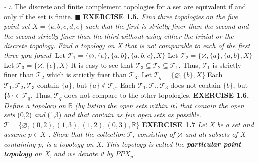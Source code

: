 \documentclass[12pt]{article}
\begin{document}
	\newline \(\square\) \newline
	\(\therefore\) The discrete and finite complement topologies for a set are equivalent if and only if the set is finite. \newline
	\(\blacksquare\)
	\newpage
	\noindent
	\textbf{EXERCISE 1.5.} \textit{Find three topologies on the five point set} \(X=\{a,b,c,d,e\}\) \textit{such that the first is strictly finer than the second and the second strictly finer than the third without using either the trivial or the discrete topology. Find a topology on X that is not comparable to each of the first three you found.}
	\newline \newline
	Let \(\mathcal{T}_1=\{\varnothing, \{a\}, \{a,b\}, \{a,b,c\}, X\}\)
	\newline
	Let \(\mathcal{T}_2=\{\varnothing, \{a\}, \{a,b\}, X\}\)
	\newline
	Let \(\mathcal{T}_3=\{\varnothing, \{a\}, X\}\)
	\newline \newline
	It is easy to see that \(\mathcal{T}_3 \subseteq \mathcal{T}_2 \subseteq \mathcal{T}_1\). \newline
	Thus, \(\mathcal{T}_1\) is strictly finer than \(\mathcal{T}_2\) which is strictly finer than \(\mathcal{T}_3\).
	\newline \newline
	Let \(\mathcal{T}_q=\{\varnothing, \{b\}, X\}\) \newline \newline
	Each \(\mathcal{T}_1,\mathcal{T}_2,\mathcal{T}_3\) contain \(\{a\}\), but \(\{a\} \notin \mathcal{T}_q\). \newline
	Each \(\mathcal{T}_1,\mathcal{T}_2,\mathcal{T}_3\) does not contain \(\{b\}\), but \(\{b\} \in \mathcal{T}_q\). \newline \newline
	Thus, \(\mathcal{T}_q\) does not compare to the other topologies.
	\newline
	\newpage
	\noindent
	\textbf{EXERCISE 1.6.} \textit{Define a topology on }\(\mathbb{R}\)\textit{ (by listing the open sets within it) that contain the open sets} (0,2) \textit{and} (1,3) \textit{and that contain as few open sets as possible.} \newline \newline
	\(\mathcal{T}=\{\varnothing, (0,2), (1,3), (1,2), (0,3), \mathbb{R}\}\)
	\newpage
	\noindent
	\textbf{EXERCISE 1.7} \textit{Let X be a set and assume }\(p \in X\) \textit{. Show that the collection} \(\mathcal{T}\)\textit{, consisting of} \(\varnothing\) \textit{and all subsets of X containing p, is a topology on X. This topology is called the \textbf{particular point topology} on X, and we denote it by }\(PPX_p\). \newline \newline
\end{document}
